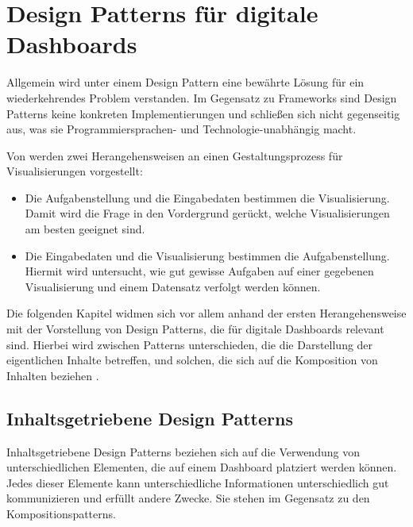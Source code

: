 \section{Design Patterns für digitale Dashboards}\label{sec:design-patterns-list}

Allgemein wird unter einem Design Pattern eine bewährte Lösung für ein wiederkehrendes Problem verstanden.
Im Gegensatz zu Frameworks sind Design Patterns keine konkreten Implementierungen und schließen sich nicht gegenseitig aus, was sie Programmiersprachen- und Technologie-unabhängig macht.

Von \autocite[S. 2367]{Schulz.DesignSpaceVisualizationTasks.2013} werden zwei Herangehensweisen an einen Gestaltungsprozess für Visualisierungen vorgestellt:

\begin{itemize}
    \item Die Aufgabenstellung und die Eingabedaten bestimmen die Visualisierung.
    Damit wird die Frage in den Vordergrund gerückt, welche Visualisierungen am besten geeignet sind.
    \item Die Eingabedaten und die Visualisierung bestimmen die Aufgabenstellung.
    Hiermit wird untersucht, wie gut gewisse Aufgaben auf einer gegebenen Visualisierung und einem Datensatz verfolgt werden können.
\end{itemize}

Die folgenden Kapitel widmen sich vor allem anhand der ersten Herangehensweise mit der Vorstellung von Design Patterns, die für digitale Dashboards relevant sind.
Hierbei wird zwischen Patterns unterschieden, die die Darstellung der eigentlichen Inhalte betreffen, und solchen, die sich auf die Komposition von Inhalten beziehen \autocite[S. 3--5]{Bach.DashboardDesignPatterns.2023}.


\subsection{Inhaltsgetriebene Design Patterns}\label{subsec:content-design-patterns}

Inhaltsgetriebene Design Patterns beziehen sich auf die Verwendung von unterschiedlichen Elementen, die auf einem Dashboard platziert werden können.
Jedes dieser Elemente kann unterschiedliche Informationen unterschiedlich gut kommunizieren und erfüllt andere Zwecke.
Sie stehen im Gegensatz zu den Kompositionspatterns.

